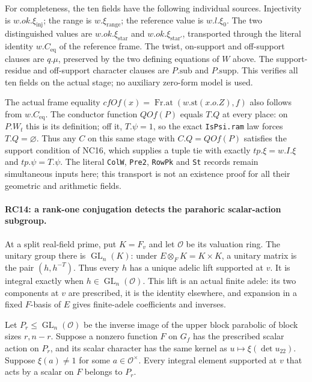 For completeness, the ten fields have the following individual sources.
Injectivity is $w.ok.\xi_{\mathrm{inj}}$; the range is $w.\xi_{\mathrm{range}}$;
the reference value is $w.l.\xi_0$.
The two distinguished values are $w.ok.\xi_{\mathrm{star}}$ and
$w.ok.\xi_{\mathrm{star'}}$, transported through the literal identity
$w.C_{\mathrm{eq}}$ of the reference frame.
The twist, on-support and off-support clauses are $q.\mu$,
preserved by the two defining equations of $W$ above.
The support-residue and off-support character clauses are $P.\mathrm{sub}$
and $P.\mathrm{supp}$. This verifies all ten fields on the actual stage;
no auxiliary zero-form model is used.

The actual frame equality
$cfOf(x)=\operatorname{Fr.at}(w.\mathrm{st}(x.o.Z),f)$
also follows from $w.C_{\mathrm{eq}}$.
The conductor function $QOf(P)$ equals $T.Q$ at every place:
on $P.W_t$ this is its definition; off it, $T.\psi=1$, so the exact
\texttt{IsPsi.ram} law forces $T.Q=\varnothing$.
Thus any $C$ on this same stage with $C.Q=QOf(P)$ satisfies the
support condition of NC16, which supplies a tuple tie with exactly
$tp.\xi=w.I.\xi$ and $tp.\psi=T.\psi$.
The literal \texttt{ColW}, \texttt{Pre2}, \texttt{RowPk} and
\texttt{St} records remain simultaneous inputs here; this transport is
not an existence proof for all their geometric and arithmetic fields.

\paragraph{RC14: a rank-one conjugation detects the parahoric scalar-action subgroup.}
At a split real-field prime, put $K=F_v$ and let $\mathcal O$ be its
valuation ring. The unitary group there is $\operatorname{GL}_n(K)$:
under $E\otimes_F K=K\times K$, a unitary matrix is the pair
$(h,h^{-T})$. Thus every $h$ has a unique adelic lift supported at $v$.
It is integral exactly when $h\in\operatorname{GL}_n(\mathcal O)$.
This lift is an actual finite adele: its two components at $v$ are
prescribed, it is the identity elsewhere, and expansion in a fixed
$F$-basis of $E$ gives finite-adele coefficients and inverses.

Let $P_r\le\operatorname{GL}_n(\mathcal O)$ be the inverse image of
the upper block parabolic of block sizes $r,n-r$.
Suppose a nonzero function $F$ on $G_f$ has the prescribed scalar
action on $P_r$, and its scalar character has the same kernel as
$u\mapsto\xi(\det u_{22})$. Suppose $\xi(a)\ne1$ for some
$a\in\mathcal O^\times$. Every integral element supported at $v$ that
acts by a scalar on $F$ belongs to $P_r$.

